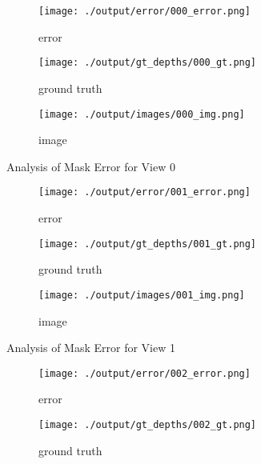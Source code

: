 \documentclass{article}
\begin{document}
\begin{figure}
	\centering
	\begin{subfigure}{0.3\textwidth}
		\centering
		\texttt{[image: ./output/error/000\_error.png]}
		\caption{error}
		\label{fig:error0}
	\end{subfigure}
	\hfill
	\centering
	\begin{subfigure}{0.3\textwidth}
		\centering
		\texttt{[image: ./output/gt\_depths/000\_gt.png]}
		\caption{ground truth}
		\label{fig:gt0}
	\end{subfigure}
	\hfill
	\centering
	\begin{subfigure}{0.3\textwidth}
		\centering
		\texttt{[image: ./output/images/000\_img.png]}
		\caption{image}
		\label{fig:img0}
	\end{subfigure}
	\hfill
	\caption{Analysis of Mask Error for View 0}
	\label{fig:error_analys0}
\end{figure}\begin{figure}
	\centering
	\begin{subfigure}{0.3\textwidth}
		\centering
		\texttt{[image: ./output/error/001\_error.png]}
		\caption{error}
		\label{fig:error1}
	\end{subfigure}
	\hfill
	\centering
	\begin{subfigure}{0.3\textwidth}
		\centering
		\texttt{[image: ./output/gt\_depths/001\_gt.png]}
		\caption{ground truth}
		\label{fig:gt1}
	\end{subfigure}
	\hfill
	\centering
	\begin{subfigure}{0.3\textwidth}
		\centering
		\texttt{[image: ./output/images/001\_img.png]}
		\caption{image}
		\label{fig:img1}
	\end{subfigure}
	\hfill
	\caption{Analysis of Mask Error for View 1}
	\label{fig:error_analys1}
\end{figure}\begin{figure}
	\centering
	\begin{subfigure}{0.3\textwidth}
		\centering
		\texttt{[image: ./output/error/002\_error.png]}
		\caption{error}
		\label{fig:error2}
	\end{subfigure}
	\hfill
	\centering
	\begin{subfigure}{0.3\textwidth}
		\centering
		\texttt{[image: ./output/gt\_depths/002\_gt.png]}
		\caption{ground truth}
		\label{fig:gt2}
	\end{subfigure}
	\hfill
	\centering
	\begin{subfigure}{0.3\textwidth}

\end{subfigure}
\end{figure}
\end{document}
